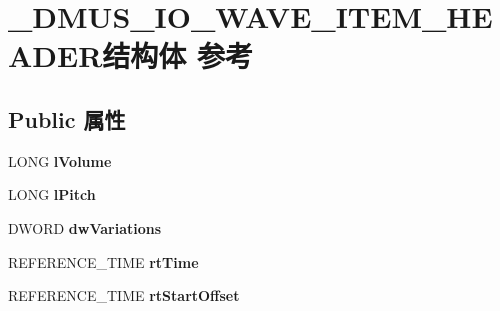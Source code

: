 \hypertarget{struct___d_m_u_s___i_o___w_a_v_e___i_t_e_m___h_e_a_d_e_r}{}\section{\+\_\+\+D\+M\+U\+S\+\_\+\+I\+O\+\_\+\+W\+A\+V\+E\+\_\+\+I\+T\+E\+M\+\_\+\+H\+E\+A\+D\+E\+R结构体 参考}
\label{struct___d_m_u_s___i_o___w_a_v_e___i_t_e_m___h_e_a_d_e_r}
\subsection*{Public 属性}
\begin{DoxyCompactItemize}
\item 
\mbox{\label{struct___d_m_u_s___i_o___w_a_v_e___i_t_e_m___h_e_a_d_e_r_a90c004f359ea85417db30a0a4b20a5bc}} 
L\+O\+NG {\bfseries l\+Volume}
\item 
\mbox{\label{struct___d_m_u_s___i_o___w_a_v_e___i_t_e_m___h_e_a_d_e_r_af155e540d19c2927ee7e3b2787f5f688}} 
L\+O\+NG {\bfseries l\+Pitch}
\item 
\mbox{\label{struct___d_m_u_s___i_o___w_a_v_e___i_t_e_m___h_e_a_d_e_r_a7b33834c0adaa7e965cbbc6cf235fcff}} 
D\+W\+O\+RD {\bfseries dw\+Variations}
\item 
\mbox{\label{struct___d_m_u_s___i_o___w_a_v_e___i_t_e_m___h_e_a_d_e_r_af23f5ba8d0a1f8c11bc711a8dc36a8fb}} 
R\+E\+F\+E\+R\+E\+N\+C\+E\+\_\+\+T\+I\+ME {\bfseries rt\+Time}
\item 
\mbox{\label{struct___d_m_u_s___i_o___w_a_v_e___i_t_e_m___h_e_a_d_e_r_a42c8cf198ea344397c8cd58916137832}} 
R\+E\+F\+E\+R\+E\+N\+C\+E\+\_\+\+T\+I\+ME {\bfseries rt\+Start\+Offset}
\item 
\mbox{\label{struct___d_m_u_s___i_o___w_a_v_e___i_t_e_m___h_e_a_d_e_r_ada72eee32a7ee38fb8b6b08d066a10cd}} 

\end{DoxyCompactItemize}
